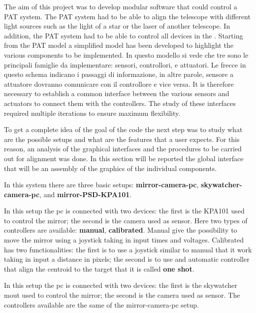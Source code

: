 The aim of this project was to develop modular software that could control a PAT system. The PAT system had to be able to align the telescope with different light sources such as the light of a star or the laser of another telescope.
In addition, the PAT system had to be able to control all devices in the .
Starting from the PAT model  a simplified model has been developed  to highlight the various components to be implemented.
In questo modello si vede che tre sono le principali famiglie da implementare: sensori, controllori, e attuatori. Le frecce in questo schema indicano i passaggi di informazione, in altre parole, sensore a attuatore dovranno comunicare con il controllore e vice versa.
It is therefore necessary to establish a common interface between the various sensors and actuators to connect them with the controllers. The study of these interfaces required multiple iterations to ensure maximum flexibility.

To get a complete idea of the goal of the code the next step was to study what are the possible setups and what are the features that a user expects. For this reason, an analysis of the graphical interfaces and the procedures to be carried out for alignment was done.
In this section will be reported the global interface that will be an assembly of the graphics of the individual components.

In this system there are three basic setups:
\textbf{mirror-camera-pc}, \textbf{skywatcher-camera-pc}, and \textbf{mirror-PSD-KPA101}.

In this setup the pc is connected with two devices: the first is
the KPA101 used to control the mirror; the second is the camera used as
sensor. Here two types of controllers are available: \textbf{manual},
\textbf{calibrated}. Manual give the possibility to move the mirror using a joystick taking
in input times and voltages. Calibrated has two functionalities: the first is to use a joystick
similar to manual that it work taking in input a distance in pixels; the
second is to use and automatic controller that align the centroid to the
target that it is called \textbf{one shot}.

In this setup the pc is connected with two devices: the first is
the skywatcher mout used to control the mirror; the second is the camera used as
sensor. The controllers available are the same of the mirror-camera-pc setup.


